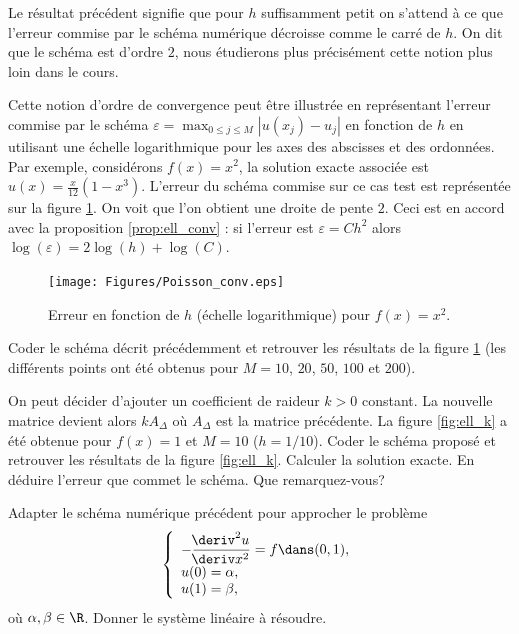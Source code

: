 \documentclass[12pt,a4paper,twoside]{article}
\begin{document}
Le r\'esultat pr\'ec\'edent signifie que pour $h$ suffisamment petit
on s'attend \`a ce que l'erreur commise par le sch\'ema num\'erique d\'ecroisse
comme le carr\'e de $h$.
On dit que le sch\'ema est d'ordre $2$, nous \'etudierons plus pr\'ecis\'ement cette notion
plus loin dans le cours.


Cette notion d'ordre de convergence peut \^etre illustr\'ee en repr\'esentant 
l'erreur commise par le sch\'ema 
$\varepsilon = \max_{0\leq j \leq M} |u(x_j) - u_j|$ en fonction de $h$ 
en utilisant une \'echelle logarithmique
pour les axes des abscisses et des ordonn\'ees.
Par exemple, consid\'erons $f(x) = x^2$, la solution exacte associ\'ee
est $u(x) = \frac{x}{12}(1-x^3)$.
L'erreur du sch\'ema commise sur ce cas test est repr\'esent\'ee
sur la figure \ref{fig:ell_convergence}.
On voit que l'on obtient une droite de pente $2$.
Ceci est en accord avec la proposition \ref{prop:ell_conv} :
si l'erreur est $\varepsilon = C h^2$ alors
$\log(\varepsilon) = 2 \log(h) + \log(C)$.

\begin{figure}[h]
  \centering
  \texttt{[image: Figures/Poisson\_conv.eps]}
  \caption{Erreur en fonction de $h$ (\'echelle logarithmique)
    pour $f(x) = x^2$.}
  \label{fig:ell_convergence}
\end{figure}


\begin{exercise}
  Coder le sch\'ema d\'ecrit pr\'ec\'edemment et retrouver les 
  r\'esultats de la figure \ref{fig:ell_convergence}
  (les diff\'erents points ont \'et\'e obtenus pour $M=10$, $20$,
  $50$, $100$ et $200$).
\end{exercise}

\begin{exercise}
  On peut d\'ecider d'ajouter un coefficient de raideur $k>0$ constant.
  La nouvelle matrice devient alors $k A_{\Delta}$ o\`u $A_{\Delta}$ est la matrice 
  pr\'ec\'edente.
  La figure \ref{fig:ell_k} a \'et\'e obtenue pour $f(x) = 1$
  et $M=10$ ($h=1/10$).
  Coder le sch\'ema propos\'e et retrouver les r\'esultats
  de la figure \ref{fig:ell_k}.
  Calculer la solution exacte.
  En d\'eduire l'erreur que commet le sch\'ema.
  Que remarquez-vous?
\end{exercise}


\begin{exercise}
  Adapter le sch\'ema num\'erique pr\'ec\'edent pour approcher
  le probl\`eme
  \begin{align*}
    \left\{
    \begin{array}{l}
      - \dfrac{\!\deriv^2 u}{\!\deriv x^2} = f \dans (0,1) ,
      \\
      u(0) = \alpha ,
      \\
      u(1) = \beta ,
    \end{array}
    \right.
  \end{align*}
  o\`u $\alpha, \beta \in \R$.
  Donner le syst\`eme lin\'eaire \`a r\'esoudre.
\end{exercise}
\end{document}

